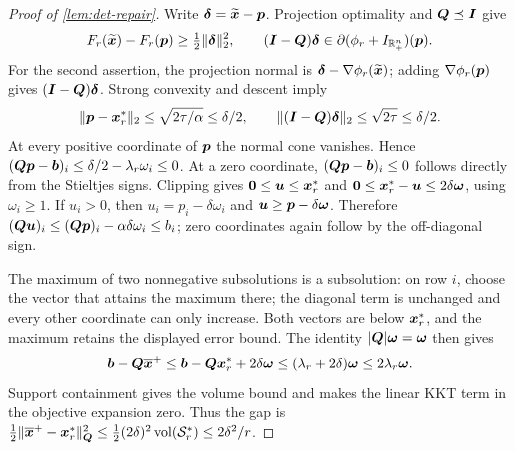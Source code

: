 \begin{proof}[Proof of \cref{lem:det-repair}]
Write $\bm{\delta}=\widetilde{\bm{x}}-\bm{p}$. Projection optimality and
$\bm{Q}\preceq\bm{I}$ give
\begin{equation}
 F_r(\widetilde{\bm{x}})-F_r(\bm{p})\geq\tfrac12\lVert\bm{\delta}\rVert_2^2,
 \qquad (\bm{I}-\bm{Q})\bm{\delta}\in
 \partial(\phi_r+I_{\mathbb{R}_+^n})(\bm{p}).
 \label{eq:det-pg-certificate}
\end{equation}
For the second assertion, the projection normal is
$\bm{\delta}-\nabla\phi_r(\widetilde{\bm{x}})$; adding
$\nabla\phi_r(\bm{p})$ gives $(\bm{I}-\bm{Q})\bm{\delta}$.
Strong convexity and descent imply
\[
 \lVert\bm{p}-\bm{x}_r^*\rVert_2\leq\sqrt{2\tau/\alpha}\leq\delta/2,
 \qquad \lVert(\bm{I}-\bm{Q})\bm{\delta}\rVert_2\leq\sqrt{2\tau}\leq\delta/2.
\]
At every positive coordinate of $\bm{p}$ the normal cone vanishes. Hence
$(\bm{Q}\bm{p}-\bm{b})_i\leq\delta/2-\lambda_r\omega_i\leq0$.
At a zero coordinate, $(\bm{Q}\bm{p}-\bm{b})_i\leq0$ follows directly from
the Stieltjes signs.
Clipping gives $\bm{0}\leq\bm{u}\leq\bm{x}_r^*$ and
$\bm{0}\leq\bm{x}_r^*-\bm{u}\leq2\delta\bm{\omega}$, using $\omega_i\geq1$.
If $u_i>0$, then $u_i=p_i-\delta\omega_i$ and
$\bm{u}\geq\bm{p}-\delta\bm{\omega}$. Therefore
$(\bm{Q}\bm{u})_i\leq(\bm{Q}\bm{p})_i-\alpha\delta\omega_i\leq b_i$;
zero coordinates again follow by the off-diagonal sign.

The maximum of two nonnegative subsolutions is a subsolution: on row $i$,
choose the vector that attains the maximum there; the diagonal term is
unchanged and every other coordinate can only increase. Both vectors are
below $\bm{x}_r^*$, and the maximum retains the displayed error bound.
The identity $|\bm{Q}|\bm{\omega}=\bm{\omega}$ then gives
\[
 \bm{b}-\bm{Q}\overline{\bm{x}}^+
 \leq\bm{b}-\bm{Q}\bm{x}_r^*+2\delta\bm{\omega}
 \leq(\lambda_r+2\delta)\bm{\omega}\leq2\lambda_r\bm{\omega}.
\]
Support containment gives the volume bound and makes the linear KKT term
in the objective expansion zero. Thus the gap is
$\tfrac12\lVert\overline{\bm{x}}^+-\bm{x}_r^*\rVert_{\bm{Q}}^2
 \leq\tfrac12(2\delta)^2\operatorname{vol}(\mathcal S_r^*)\leq2\delta^2/r$.
\end{proof}
